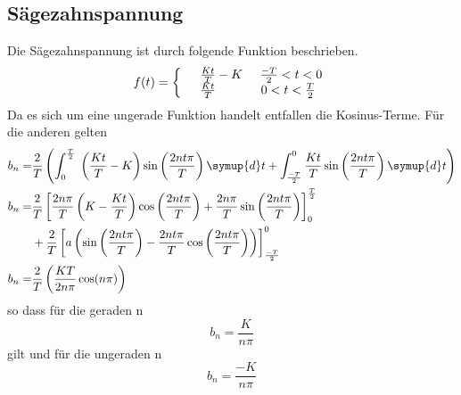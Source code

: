 \subsection{Sägezahnspannung}
\label{sec:Saegezahnspannung}
Die Sägezahnspannung ist durch folgende Funktion beschrieben.
\begin{equation*}
  f(t)=\left\{
  \begin{array}{l l}
    &\frac{Kt}{T}-K   \;\;\;\;\;\frac{-T}{2}<t<0 \\
    &\frac{Kt}{T}   \;\;\;\;\;\;\;\;\;\;\;\;\;0<t<\frac{T}{2}
  \end{array}
  \right.
\end{equation*}
Da es sich um eine ungerade Funktion handelt entfallen die Kosinus-Terme. Für die
anderen gelten
\begin{align*}
  b_n=&\frac{2}{T}\left(\int^{\frac{T}{2}}_0\;\left(\frac{Kt}{T}-K\right)
  \sin\left(\frac{2nt\pi}{T}\right)\symup{d}t +\int^0_{\frac{-T}{2}}\frac{Kt}{T}
  \sin\left(\frac{2nt\pi}{T}\right)\symup{d}t\right)\\
  b_n=&\frac{2}{T}\left[\frac{2n\pi}{T}\left(K-\frac{Kt}{T}\right)
  \cos\left(\frac{2nt\pi}{T}\right)+\frac{2n\pi}{T}\sin\left(\frac{2nt\pi}{T}\right)
  \right]^{\frac{T}{2}}_0\\
  &+\frac{2}{T}\left[a\left(\sin\left(\frac{2nt\pi}{T}\right)
  -\frac{2nt\pi}{T}\cos\left(\frac{2nt\pi}{T}\right)\right)\right]^0_\frac{-T}{2}\\
  b_n=&\frac{2}{T}\left(\frac{KT}{2n\pi}\cos(n\pi)\right)
\end{align*}
so dass für die geraden n
\begin{equation*}
  b_n=\frac{K}{n\pi}
\end{equation*}
gilt und für die ungeraden n
\begin{equation*}
  b_n=\frac{-K}{n\pi}
\end{equation*}
